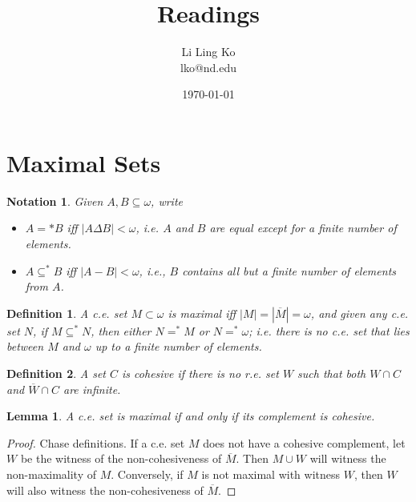 \documentclass{article}
\newtheorem{notation}{Notation}[subsection]
\newtheorem{definition}{Definition}[subsection]
\newtheorem{lemma}{Lemma}[subsection]
\begin{document}
\title{Readings}
\author{Li Ling Ko\\ lko@nd.edu}
\date{\today}
\maketitle

\section{Maximal Sets}
  \begin{notation}
    Given $A,B\subseteq\omega$, write
    \begin{itemize}
      \item $A=*B$ iff $|A\Delta B|<\omega$, i.e. $A$ and $B$ are equal
        except for a finite number of elements.
      \item $A\subseteq^*B$ iff $|A-B|<\omega$, i.e., $B$ contains all but
        a finite number of elements from $A$.
    \end{itemize}
  \end{notation}

  \begin{definition}
    A c.e. set $M\subset\omega$ is \textit{maximal} iff
    $|M|=|\overline{M}|=\omega$, and given any c.e. set $N$, if
    $M\subseteq^* N$, then either $N=^*M$ or $N=^*\omega$; i.e. there is no
    c.e. set that lies between $M$ and $\omega$ up to a finite number of
    elements.
  \end{definition}

  \begin{definition}
    A set $C$ is \textit{cohesive} if there is no r.e. set $W$ such that
    both $W\cap C$ and $\overline{W}\cap C$ are infinite.
  \end{definition}

  \begin{lemma}
    A c.e. set is maximal if and only if its complement is cohesive.
    \label{lemma:maximal-cohesive}
  \end{lemma}
  \begin{proof}
    Chase definitions. If a c.e. set $M$ does not have a cohesive
    complement, let $W$ be the witness of the non-cohesiveness of
    $\overline{M}$. Then $M\cup W$ will witness the non-maximality of $M$.
    Conversely, if $M$ is not maximal with witness $W$, then $W$ will also
    witness the non-cohesiveness of $\overline{M}$.
  \end{proof}

\end{document}
